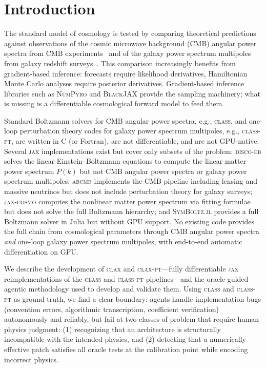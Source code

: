 \documentclass{article}
\newcommand{\clax}{\textsc{clax}\xspace}
\newcommand{\claxpt}{\textsc{clax-pt}\xspace}
\newcommand{\class}{\textsc{class}\xspace}
\newcommand{\classpt}{\textsc{class-pt}\xspace}
\newcommand{\discoeb}{\textsc{disco-eb}\xspace}
\newcommand{\abcmb}{\textsc{abcmb}\xspace}
\newcommand{\jax}{\textsc{jax}\xspace}
\newcommand{\Pk}{P(k)}
\begin{document}
\section{Introduction}
\label{sec:intro}

The standard model of cosmology is tested by comparing theoretical predictions against observations of the cosmic microwave background (CMB) angular power spectra from CMB experiments~\citep[e.g.,][]{Planck:2018vyg} and of the galaxy power spectrum multipoles from galaxy redshift surveys~\citep[e.g.,][]{DESI:2024jxi,DESI:2024hhd}.
This comparison increasingly benefits from gradient-based inference: forecasts require likelihood derivatives, Hamiltonian Monte Carlo analyses require posterior derivatives.
Gradient-based inference libraries such as \textsc{NumPyro} \citep{phan2019} and \textsc{BlackJAX} \citep{cabezas2024} provide the sampling machinery; what is missing is a differentiable cosmological forward model to feed them.

Standard Boltzmann solvers for CMB angular power spectra, e.g., \class \citep{lesgourgues2011}, and one-loop perturbation theory codes for galaxy power spectrum multipoles, e.g., \classpt, are written in C (or Fortran), are not differentiable, and are not GPU-native.
Several \jax implementations exist but cover only subsets of the problem: \discoeb \citep{hahn2023} solves the linear Einstein--Boltzmann equations to compute the linear matter power spectrum $\Pk$ but not CMB angular power spectra or galaxy power spectrum multipoles; \abcmb \citep{zhou2026} implements the CMB pipeline including lensing and massive neutrinos but does not include perturbation theory for galaxy surveys; \textsc{jax-cosmo} \citep{lemos2023} computes the nonlinear matter power spectrum via fitting formulae but does not solve the full Boltzmann hierarchy; and \textsc{SymBoltz.jl} \citep{sletmoen2026} provides a full Boltzmann solver in Julia but without GPU support.
No existing code provides the full chain from cosmological parameters through CMB angular power spectra \emph{and} one-loop galaxy power spectrum multipoles, with end-to-end automatic differentiation on GPU.

We describe the development of \clax and \claxpt---fully differentiable \jax reimplementations of the \class \citep{lesgourgues2011} and \classpt \citep{chudaykin2021} pipelines---and the oracle-guided agentic methodology used to develop and validate them.
Using \class and \classpt as ground truth, we find a clear boundary: agents handle implementation bugs (convention errors, algorithmic transcription, coefficient verification) autonomously and reliably, but fail at two classes of problem that require human physics judgment: (1) recognizing that an architecture is structurally incompatible with the intended physics, and (2) detecting that a numerically effective patch satisfies all oracle tests at the calibration point while encoding incorrect physics.
\end{document}
